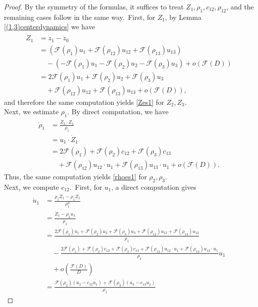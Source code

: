 \documentclass[reqno]{amsart}
\theoremstyle{plain}
\theoremstyle{definition}
\numberwithin{equation}{section}
\newcommand{\1}{\mathbbm{1}}
\begin{document}
\begin{proof}
By the symmetry of the formulas, it suffices to treat $Z_1,\rho_1,c_{12},\rho_{12}$, and the remaining cases follow in the same way.\ First, for $Z_1$, by Lemma \ref{(1,3)centerdynamics} we have
\begin{align*}
\dot{Z}_1&=\dot{z}_1-\dot{z}_0
\\
&=\left(\mathcal{F}(\rho_1)u_1+\mathcal{F}(\rho_{12})u_{12}+\mathcal{F}(\rho_{13})u_{13}\right)
\\
&\quad-\left(-\mathcal{F}(\rho_1)u_1-\mathcal{F}(\rho_2)u_2-\mathcal{F}(\rho_3)u_3\right)+o\left(\mathcal{F}(D)\right)
\\
&=2\mathcal{F}(\rho_1)u_1+\mathcal{F}(\rho_2)u_2+\mathcal{F}(\rho_3)u_3
\\
&\quad +\mathcal{F}(\rho_{12})u_{12}+\mathcal{F}(\rho_{13})u_{13}+o\left(\mathcal{F}(D)\right),
\end{align*}
and therefore the same computation yields \eqref{Zes1} for $Z_2,Z_3$.
\\
Next, we estimate $\rho_1$. By direct computation, we have
\begin{align*}
\dot{\rho}_1&=\frac{\dot{Z}_1\cdot Z_1}{\rho_1}
\\
&=u_1\cdot \dot{Z}_1
\\
&=2\mathcal{F}(\rho_1)+\mathcal{F}(\rho_2)c_{12}+\mathcal{F}(\rho_3)c_{13}
\\
&\quad+\mathcal{F}(\rho_{12})u_{12}\cdot u_1+\mathcal{F}(\rho_{13})u_{13}\cdot u_1+o\left(\mathcal{F}(D)\right).
\end{align*}
Thus, the same computation yields \eqref{rhoes1} for $\rho_2,\rho_3$.
\\
Next, we compute $c_{12}$.\ First, for $u_1$, a direct computation gives
\begin{align*}
\dot{u}_1&=\frac{\rho_1\dot{Z}_1-\dot{\rho}_1Z_1}{\rho_1^2}
\\
&=\frac{\dot{Z}_1-\dot{\rho}_1u_1}{\rho_1}
\\
&=\frac{2\mathcal{F}(\rho_1)u_1+\mathcal{F}(\rho_2)u_2+\mathcal{F}(\rho_3)u_3+\mathcal{F}(\rho_{12})u_{12}+\mathcal{F}(\rho_{13})u_{13}}{\rho_1}
\\
&\quad-\frac{2\mathcal{F}(\rho_1)+\mathcal{F}(\rho_2)c_{12}+\mathcal{F}(\rho_3)c_{13}+\mathcal{F}(\rho_{12})u_{12}\cdot u_1+\mathcal{F}(\rho_{13})u_{13}\cdot u_1}{\rho_1}u_1
\\
&\quad+o\left(\frac{\mathcal{F}(D)}{D}\right)
\\
&=\frac{\mathcal{F}(\rho_2)(u_2-c_{12}u_1)+\mathcal{F}(\rho_3)(u_3-c_{13}u_1)}{\rho_1}

\end{align*}
\end{proof}
\end{document}
